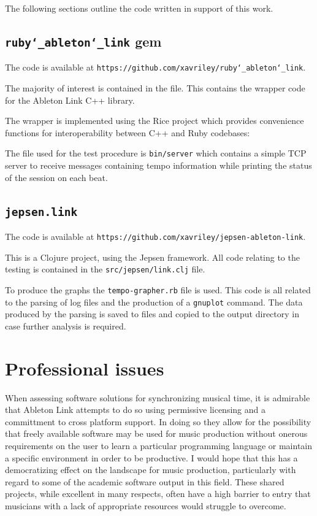\documentclass[11pt]{article} %
\theoremstyle{plain}
\theoremstyle{definition}
\begin{document}
The following sections outline the code written in support of this work.

\subsection{\texttt{ruby\char`_ableton\char`_link} gem}

The code is available at
\texttt{https://github.com/xavriley/ruby\char`_ableton\char`_link}.

The majority of interest is contained in the
\texttt{} file. This contains the
wrapper code for the Ableton Link C++ library.

The wrapper is implemented using the Rice project which provides convenience
functions for interoperability between C++ and Ruby codebases:
\texttt{}

The file used for the test procedure is \texttt{bin/server} which contains a
simple TCP server to receive messages containing tempo information while
printing the status of the session on each beat.

\subsection{\texttt{jepsen.link}}

The code is available at
\texttt{https://github.com/xavriley/jepsen-ableton-link}.

This is a Clojure project, using the Jepsen framework. All code relating to the
testing is contained in the \texttt{src/jepsen/link.clj} file.

To produce the graphs the \texttt{tempo-grapher.rb} file is used. This code is
all related to the parsing of log files and the production of a
\texttt{gnuplot} command. The data produced by the parsing is saved to files
and copied to the output directory in case further analysis is required.

\section{Professional issues}

When assessing software solutions for synchronizing musical time, it is
admirable that Ableton Link attempts to do so using permissive licensing and a
committment to cross platform support. In doing so they allow for the
possibility that freely available software may be used for music production
without onerous requirements on the user to learn a particular programming
language or maintain a specific environment in order to be productive. I would
hope that this has a democratizing effect on the landscape for music
production, particularly with regard to some of the academic software output in
this field. These shared projects, while excellent in many respects, often have
a high barrier to entry that musicians with a lack of appropriate resources
would struggle to overcome.
\end{document}
